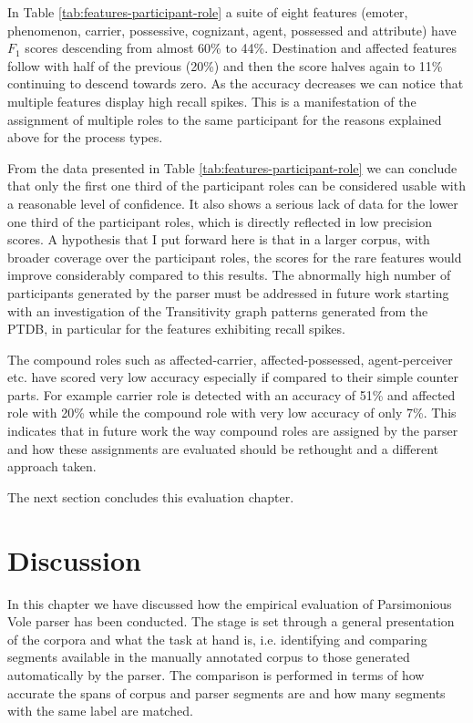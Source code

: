     In Table \ref{tab:features-participant-role} a suite of eight features (emoter, phenomenon, carrier, possessive, cognizant, agent, possessed and attribute) have $F_1$ scores descending from almost 60\% to 44\%. Destination and affected features follow with half of the previous (20\%) and then the score halves again to 11\% continuing to descend towards zero. As the accuracy decreases we can notice that multiple features display high recall spikes. This is a manifestation of the assignment of multiple roles to the same participant for the reasons explained above for the process types. 

    From the data presented in Table \ref{tab:features-participant-role} we can conclude that only the first one third of the participant roles can be considered usable with a reasonable level of confidence. It also shows a serious lack of data for the lower one third of the participant roles, which is directly reflected in low precision scores. A hypothesis that I put forward here is that in a larger corpus, with broader coverage over the participant roles, the scores for the rare features would improve considerably compared to this results. The abnormally high number of participants generated by the parser must be addressed in future work starting with an investigation of the Transitivity graph patterns generated from the PTDB, in particular for the features exhibiting recall spikes. 
    
    The compound roles such as affected-carrier, affected-possessed, agent-perceiver etc. have scored very low accuracy especially if compared to their simple counter parts. For example carrier role is detected with an accuracy of 51\% and affected role with  20\% while the compound role with very low accuracy of only 7\%. This indicates that in future work the way compound roles are assigned by the parser and how these assignments are evaluated should be rethought and a different approach taken.  
    
    The next section concludes this evaluation chapter.

\section{Discussion}
\label{sec:evaluation-discussion}
    
    In this chapter we have discussed how the empirical evaluation of Parsimonious Vole parser has been conducted. The stage is set through a general presentation of the corpora and what the task at hand is, i.e. identifying and comparing segments available in the manually annotated corpus to those generated automatically by the parser. The comparison is performed in terms of how accurate the spans of corpus and parser segments are and how many segments with the same label are matched.
    
